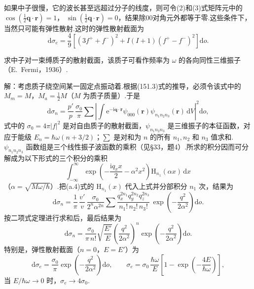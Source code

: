\begin{xiti}
如果中子很慢，它的波长甚至远超过分子的线度，则可令(2)和(3)式矩阵元中的
$\cos\left(\frac{1}{2}\boldsymbol{q}\cdot\boldsymbol{r}\right)=1$，
$\sin\left(\frac{1}{2}\boldsymbol{q}\cdot\boldsymbol{r}\right)=0$，结果除00对角元外都等于零.这些条件下，当然只可能有弹性散射.这时的弹性散射截面为
\begin{equation*}
  \mathrm{d}\sigma_e=\frac{4}{9}\left[\left(3f^{+}+f^{-}\right)^2
  +I(I+1)\left(f^{+}-f^{-}\right)^2\right]\mathrm{d}o.
\end{equation*}

\quad 求中子对一束缚质子的散射截面，该质子可看作频率为 $\omega$ 的各向同性三维振子（E.~Fermi，1936）.

解：考虑质子绕空间某一固定点振动着.根据(151.3)式的推导，必须令该式中的 $M_m=M$，$M_a=\frac{1}{2}M$（$M$ 为质子质量）.于是
\begin{equation*}
  \mathrm{d}\sigma_n=\frac{p'}{p}\,\frac{\sigma_0}{\pi}\sum
  \left|\int\mathrm{e}^{-\mathrm{i}\boldsymbol{q}\cdot\boldsymbol{r}}
  \psi_{000}(\boldsymbol{r})\psi_{n_1n_2n_3}(\boldsymbol{r})\,\mathrm{d}V\right|^2\mathrm{d}o,
\end{equation*}
式中的 $\sigma_0=4\pi|f|^2$ 是对自由质子的散射截面，$\psi_{n_1n_2n_3}$ 是三维振子的本征函数，对应于能级 $E_n=\hbar\omega(n+3/2)$；$\sum$ 是对和为 $n$ 的所有 $n_1,n_2$ 和 $n_3$ 值求和.$\psi_{n_1n_2n_3}$ 函数组是三个线性振子波函数的乘积（见§33，题4）.所求的积分因而可分解成为以下形式的三个积分的乘积
\begin{equation*}
  \int_{-\infty}^{\infty}\exp\left(-\frac{\mathrm{i}q_xx}{2}-\alpha^2x^2\right)
  \mathrm{H}_{n_1}(\alpha x)\,\mathrm{d}x
\end{equation*}
（$\alpha=\sqrt{M\omega/\hbar}$）.把(a.4)式的 $\mathrm{H}_{n_1}(x)$ 代入上式并分部积分 $n_1$ 次，结果为
\begin{equation*}
  \mathrm{d}\sigma_n=\frac{1}{\pi}\,\frac{v'}{v}\,\frac{\sigma_0}{2^n\alpha^{2n}}\sum
  \frac{q_x^{2n_1}q_y^{2n_2}q_z^{2n_3}}{n_1!\,n_2!\,n_3!}\,
  \exp\left(-\frac{q^2}{2\alpha^2}\right)\mathrm{d}o.
\end{equation*}
按二项式定理进行求和后，最后结果为
\begin{equation*}
  \mathrm{d}\sigma_n=\frac{\sigma_0}{\pi\,n!}\sqrt{\frac{E'}{E}}
  \left(\frac{q^2}{2\alpha^2}\right)^n\exp\left(-\frac{q^2}{2\alpha^2}\right)\mathrm{d}o.
\end{equation*}
特别是，弹性散射截面（$n=0$，$E=E'$）为
\begin{equation*}
  \mathrm{d}\sigma_e=\frac{\sigma_0}{\pi}\exp\left(-\frac{q^2}{2\alpha^2}\right)\mathrm{d}o,\qquad
  \sigma_e=\sigma_0\,\frac{\hbar\omega}{E}\left[1-\exp\left(-\frac{4E}{\hbar\omega}\right)\right],
\end{equation*}
当 $E/\hbar\omega\to0$ 时，$\sigma_e\to4\sigma_0$.

\end{xiti}
\setcounter{equation}{0}%

